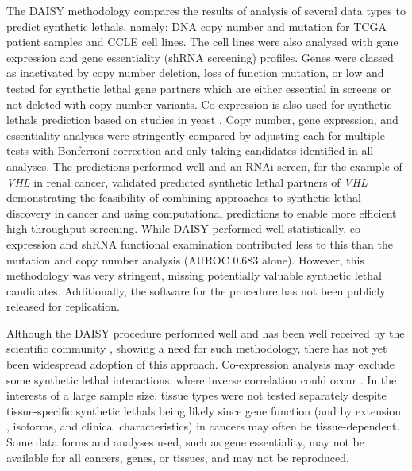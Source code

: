 The \gls{DAISY} methodology \citep{Jerby2014} compares the results of analysis of several data types to predict \glspl{synthetic lethal}, namely: \acrshort{DNA} copy number and  \gls{mutation} for \gls{TCGA} patient samples and \gls{CCLE} cell lines. The cell lines were also analysed with \gls{gene expression} and gene essentiality (\gls{shRNA} screening) profiles. Genes were classed as inactivated by copy number deletion,  loss of function \gls{mutation}, or low  and tested for \gls{synthetic lethal} gene partners which are either \gls{essential} in screens or not deleted with copy number variants. Co-expression is also used for \glspl{synthetic lethal} prediction based on studies in yeast \citep{Costanzo2010, Kelley2005}. Copy number, \gls{gene expression}, and essentiality analyses were stringently compared by adjusting each for multiple tests with Bonferroni correction and only taking candidates identified in all analyses. 
The predictions performed well and an \gls{RNAi} screen, for the example of \textit{VHL} in renal cancer, validated predicted \gls{synthetic lethal} partners of \textit{VHL} demonstrating the feasibility of combining approaches to \gls{synthetic lethal} discovery in cancer and using computational predictions to enable more efficient high-throughput screening. While \gls{DAISY} performed well statistically, co-expression and \gls{shRNA} functional examination contributed less to this than the \gls{mutation} and copy number analysis (\gls{AUROC} 0.683 alone). However, this methodology was very stringent, missing potentially valuable \gls{synthetic lethal} candidates. %
Additionally, the software for the procedure has not been publicly released for replication.  

Although the \gls{DAISY} procedure performed well and has been well received by the scientific community \citep{Crunkhorn2014, Lokody2014, Ryan2014}, showing a need for such methodology, there has not yet been widespread adoption of this approach. Co-expression analysis may exclude some \gls{synthetic lethal} interactions, where inverse correlation could occur \citep{Lu2015}. In the interests of a large sample size, tissue types were not tested separately despite tissue-specific \glspl{synthetic lethal} being likely since gene function (and by extension , isoforms, and clinical characteristics) in cancers may often be tissue-dependent. Some data forms and analyses used, such as gene essentiality, may not be available for all cancers, genes, or tissues, and may not be reproduced.  

